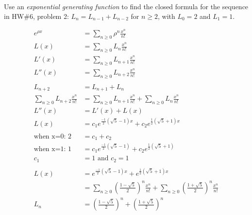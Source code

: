 Use an \textit{exponential generating function} to find the closed formula for the sequence in HW\#6, problem 2: $L_n = L_{n-1}+L_{n-2}$ for $n\ge2$, with $L_0=2$ and $L_1=1$.
\begin{framed}
	\begin{align*}
	e^{\rho x} &= \sum_{n\ge0}{\rho}^n\frac{x^n}{n!}\\
	L(x) &=  \sum_{n\ge0}L_n\frac{x^n}{n!}\\
	L'(x) &= \sum_{n\ge0}L_{n+1}\frac{x^n}{n!}\\
	L''(x) &= \sum_{n\ge0}L_{n+2}\frac{x^n}{n!}\\
	\\
	L_{n+2} &= L_{n+1} + L_{n}\\
	\sum_{n\ge0}L_{n+2}\frac{x^n}{n!} &= \sum_{n\ge0}L_{n+1}\frac{x^n}{n!} + \sum_{n\ge0}L_{n}\frac{x^n}{n!}\\
	L''(x) &= L'(x) + L(x)\\
	L(x) &= c_1e^{\frac{-1}{2}(\sqrt5-1)x} + c_2e^{\frac{1}{2}(\sqrt5+1)x}\\
	\\
	\text{when x=0: 	}2&=c_1 + c_2\\
	\text{when x=1: 	}1&=c_1e^{\frac{-1}{2}(\sqrt5-1)} + c_2e^{\frac{1}{2}(\sqrt5+1)}\\
	c_1 &= 1 \text{ and } c_2=1\\
	\\	
	L(x) &= e^{\frac{-1}{2}(\sqrt5-1)x} + e^{\frac{1}{2}(\sqrt5+1)x}\\
	&=\sum_{n\ge0}(\frac{1-\sqrt{5}}{2})^n\frac{x^n}{n!} + \sum_{n\ge0}(\frac{1+\sqrt{5}}{2})^n\frac{x^n}{n!}\\
	L_n &= (\frac{1-\sqrt{5}}{2})^n + (\frac{1+\sqrt{5}}{2})^n
	\end{align*}
\end{framed}
